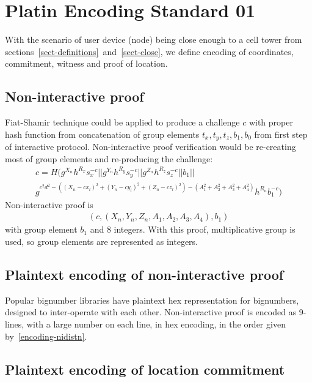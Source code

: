 \documentclass[a4paper,12pt]{article}
\begin{document}
\section{Platin Encoding Standard 01}

With the scenario of user device (node) being close enough to a cell tower
from sections~\ref{sect-definitions}~and~\ref{sect-close},
we define encoding of coordinates, commitment, witness and proof of location.

\subsection{Non-interactive proof}
Fiat-Shamir technique could be applied to produce a challenge $c$
with proper hash function from concatenation of group elements
$t_x, t_y, t_z, b_1, b_0$ from first step of interactive protocol.
Non-interactive proof verification would be
re-creating most of group elements and
re-producing the challenge:
\begin{multline}
  \label{verf-nidistn}
  c = H(g^{X_n} h^{R_x} s_x^{-c} || g^{Y_n} h^{R_y} s_y^{-c} || g^{Z_n} h^{R_z} s_z^{-c} || b_1 || \\
        g^{c^2 d^2 - ((X_n - c x_l)^2 + (Y_n - c y_l)^2 + (Z_n - c z_l)^2 ) - (A_1^2 + A_2^2 + A_3^2 + A_4^2)} h^{R_a} b_1^{-c})
\end{multline}
Non-interactive proof is
\begin{gather}
\label{encoding-nidistn}
  (c, (X_n, Y_n, Z_n, A_1, A_2, A_3, A_4), b_1)
\end{gather}
with group element $b_1$ and 8 integers.
With this proof, multiplicative group is used, so group elements are represented as integers.

\subsection{Plaintext encoding of non-interactive proof}

Popular bignumber libraries have plaintext hex representation for bignumbers,
designed to inter-operate with each other.
Non-interactive proof is encoded as 9-lines,
with a large number on each line, in hex encoding,
in the order given by~\eqref{encoding-nidistn}.

\subsection{Plaintext encoding of location commitment}
\end{document}
